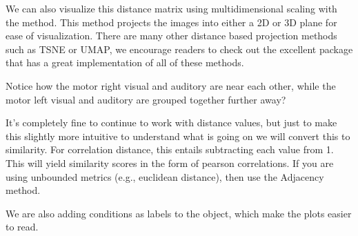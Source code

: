 \documentclass[letterpaper,10pt,english]{sphinxmanual}
\begin{document}
\noindent{}

We can also visualize this distance matrix using multidimensional scaling with the  method. This method projects the images into either a 2D or 3D plane for ease of visualization. There are many other distance based projection methods such as T\sphinxhyphen{}SNE or UMAP, we encourage readers to check out the excellent  package that has a great implementation of all of these methods.

Notice how the motor right visual and auditory are near each other, while the motor left visual and auditory are grouped together further away?

\begin{sphinxVerbatim}[commandchars=\\\{\}]
  \PYG{p}{[}\PYG{p}{]}  
\end{sphinxVerbatim}

\noindent{}

It’s completely fine to continue to work with distance values, but just to make this slightly more intuitive to understand what is going on we will convert this to similarity.  For correlation distance, this entails subtracting each value from 1. This will yield similarity scores in the form of pearson correlations. If you are using unbounded metrics (e.g., euclidean distance), then use the  Adjacency method.

We are also adding conditions as labels to the object, which make the plots easier to read.

\begin{sphinxVerbatim}[commandchars=\\\{\}]
  \PYG{p}{[}\PYG{p}{]}
   
      
        
      
\end{sphinxVerbatim}
\end{document}
